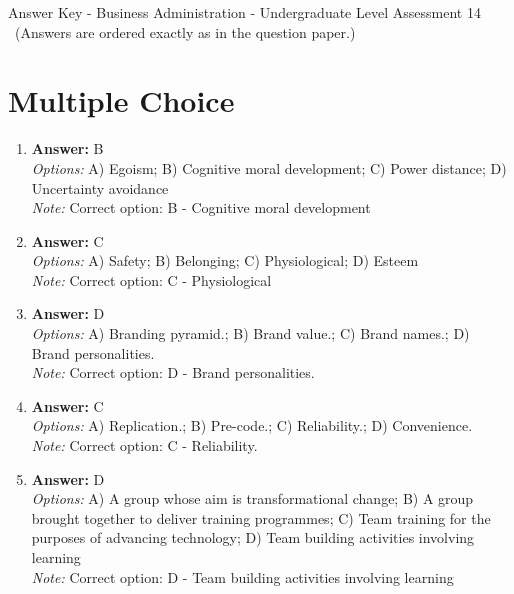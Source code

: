 \documentclass[12pt]{article}
\begin{document}
\begin{center}
Answer Key - Business Administration - Undergraduate Level Assessment 14 \
\small (Answers are ordered exactly as in the question paper.)
\end{center}

\section*{Multiple Choice}
\begin{enumerate}[label=\arabic*.]
\item \textbf{Answer:} B
\\ \textit{Options:} A) Egoism; B) Cognitive moral development; C) Power distance; D) Uncertainty avoidance
\\ \textit{Note:} Correct option: B - Cognitive moral development
\item \textbf{Answer:} C
\\ \textit{Options:} A) Safety; B) Belonging; C) Physiological; D) Esteem
\\ \textit{Note:} Correct option: C - Physiological
\item \textbf{Answer:} D
\\ \textit{Options:} A) Branding pyramid.; B) Brand value.; C) Brand names.; D) Brand personalities.
\\ \textit{Note:} Correct option: D - Brand personalities.
\item \textbf{Answer:} C
\\ \textit{Options:} A) Replication.; B) Pre-code.; C) Reliability.; D) Convenience.
\\ \textit{Note:} Correct option: C - Reliability.
\item \textbf{Answer:} D
\\ \textit{Options:} A) A group whose aim is transformational change; B) A group brought together to deliver training programmes; C) Team training for the purposes of advancing technology; D) Team building activities involving learning
\\ \textit{Note:} Correct option: D - Team building activities involving learning
\end{enumerate}
\end{document}
